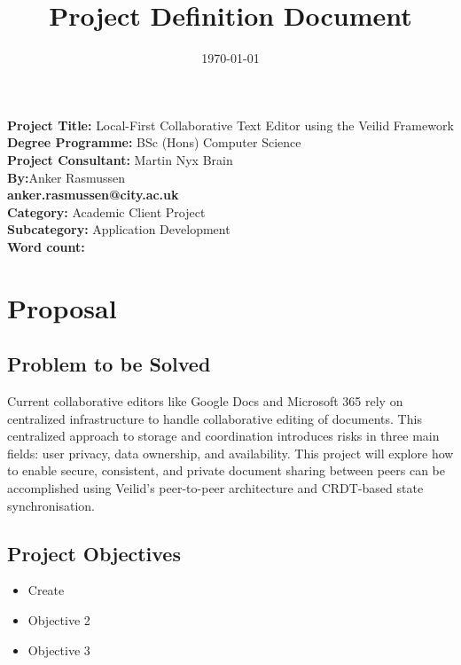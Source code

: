 \documentclass[12pt,a4paper]{article}
\title{Project Definition Document}
\author{}
\date{\today}
\begin{document}
\maketitle
\vspace{0.5cm}

\begin{center}
\textbf{Project Title:} {Local-First Collaborative Text Editor using the Veilid Framework} \\[1cm]
\textbf{Degree Programme:} {BSc (Hons) Computer Science} \\[1cm]
\textbf{Project Consultant:} {Martin Nyx Brain} \\[1cm]
\textbf{By:}{Anker Rasmussen} \\[0.2cm]
{\small \textbf{anker.rasmussen@city.ac.uk}} \\ [0.3cm]
\textbf{Category:} Academic Client Project \\[0.3cm]
{\small \textbf{Subcategory:} Application Development} \\[1cm]
\textbf {Word count:}
\end{center}

\newpage


\section{Proposal}

\subsection{Problem to be Solved}
Current collaborative editors like Google Docs and Microsoft 365 rely on centralized 
infrastructure to handle collaborative editing of documents. This centralized approach to
storage and coordination introduces risks in three main fields: user privacy, data
ownership, and availability. This project will explore how to enable secure, consistent,
and private document sharing between peers can be accomplished using Veilid's peer-to-peer
architecture and CRDT-based state synchronisation.


\subsection{Project Objectives}
\begin{itemize}[noitemsep]
    \item Create 
    \item Objective 2
    \item Objective 3
\end{itemize}
\end{document}
